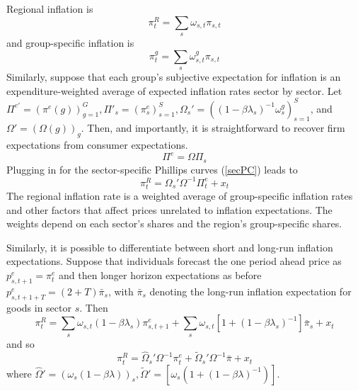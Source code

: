 \documentclass[12pt]{article}
\begin{document}
Regional inflation is 
$$\pi^R_t = \sum_{s}\omega_{s,t}\pi_{s,t}$$
and group-specific inflation is
$$ \pi^g_t = \sum_s\omega^g_{s,t}\pi_{s,t}$$
Similarly, suppose that each group's subjective expectation for inflation is an expenditure-weighted average of expected inflation rates sector by sector. Let $\Pi^{e'}=\left(\pi^e(g)\right)_{g=1}^{G}, \Pi'_s=\left(\pi^e_s\right)_{s=1}^{S}, \Omega_s' = \left(\left(1-\beta\lambda_s\right)^{-1}\omega^g_s\right)_{s=1}^{S}$, and $\Omega' = \left(\Omega(g)\right)_g$. Then, and importantly, it is straightforward to recover firm expectations from consumer expectations.
\begin{equation}\label{Ident}
 \Pi^e = \Omega\Pi_s
\end{equation}
Plugging in for the sector-specific Phillips curves (\ref{secPC}) leads to
\begin{equation}\label{LOM}
\pi^R_t = \Omega_s'\Omega^{-1}\Pi^e_t + x_t
\end{equation}
The regional inflation rate is a weighted average of group-specific inflation rates and other factors that affect prices unrelated to inflation expectations. The weights depend on each sector's shares and the region's group-specific shares.

Similarly, it is possible to differentiate between short and long-run inflation expectations. Suppose that individuals forecast the one period ahead price as $p^e_{s,t+1} = \pi^e_t$ and then longer horizon expectations as before $p^e_{s,t+1+T} = (2+T)\bar{\pi}_s$, with $\bar{\pi}_s$ denoting the long-run inflation expectation for goods in sector $s$. Then
$$ \pi_t^R = \sum_s\omega_{s,t}\left( 1-\beta\lambda_s\right)\pi^e_{s,t+1}+\sum_s\omega_{s,t}\left[1+\left(1-\beta\lambda_s\right)^{-1}\right]\bar{\pi}_s + x_t$$
and so
$$ \pi_t^R = \hat{\Omega}_s'\Omega^{-1}\pi^e_t + \tilde{\Omega}_s'\Omega^{-1}\bar{\pi}+x_t$$
where $\hat{\Omega}'=\left(\omega_s(1-\beta\lambda)\right)_{s}, \tilde{\Omega}' = \left[ \omega_s\left( 1+(1-\beta\lambda )^{-1}\right)\right]$.
\end{document}
